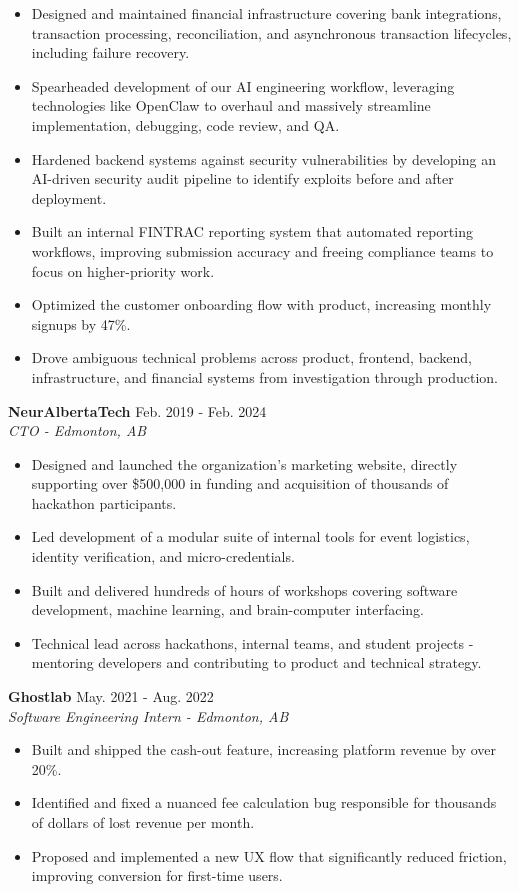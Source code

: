 \documentclass[10pt,letterpaper]{article}
\newcommand{\resumeHeading}[3]{
    \textbf{#1} \hfill #3\\
    \textit{#2}
}
\newcommand{\resumeFooting}[0]{
    \vspace{0.5em}
}
\begin{document}
\begin{itemize}
\item Designed and maintained financial infrastructure covering bank integrations, transaction processing, reconciliation, and asynchronous transaction lifecycles, including failure recovery.
\item Spearheaded development of our AI engineering workflow, leveraging technologies like OpenClaw to overhaul and massively streamline implementation, debugging, code review, and QA.
\item Hardened backend systems against security vulnerabilities by developing an AI-driven security audit pipeline to identify exploits before and after deployment.
\item Built an internal FINTRAC reporting system that automated reporting workflows, improving submission accuracy and freeing compliance teams to focus on higher-priority work.
\item Optimized the customer onboarding flow with product, increasing monthly signups by 47\%.
\item Drove ambiguous technical problems across product, frontend, backend, infrastructure, and financial systems from investigation through production.
\end{itemize}
\resumeFooting{}

\resumeHeading
{NeurAlbertaTech}
{CTO - Edmonton, AB}
{Feb. 2019 - Feb. 2024}

\begin{itemize}
\item Designed and launched the organization's marketing website, directly supporting over \$500,000 in funding and acquisition of thousands of hackathon participants.
\item Led development of a modular suite of internal tools for event logistics, identity verification, and micro-credentials.
\item Built and delivered hundreds of hours of workshops covering software development, machine learning, and brain-computer interfacing.
\item Technical lead across hackathons, internal teams, and student projects - mentoring developers and contributing to product and technical strategy.
\end{itemize}
\resumeFooting{}

\resumeHeading
{Ghostlab}
{Software Engineering Intern - Edmonton, AB}
{May. 2021 - Aug. 2022}

\begin{itemize}
\item Built and shipped the cash-out feature, increasing platform revenue by over 20\%.
\item Identified and fixed a nuanced fee calculation bug responsible for thousands of dollars of lost revenue per month.
\item Proposed and implemented a new UX flow that significantly reduced friction, improving conversion for first-time users.
\end{itemize}
\resumeFooting{}
\end{document}
